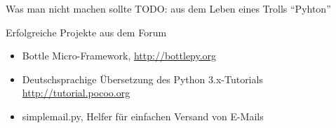 \documentclass{beamer}
\begin{document}
\begin{frame}{Was man nicht machen sollte}
  TODO: aus dem Leben eines Trolls
  \enquote{Pyhton}
\end{frame}

\begin{frame}{Erfolgreiche Projekte aus dem Forum}
  \begin{itemize}
    \item Bottle Micro-Framework, \url{http://bottlepy.org}
    \item Deutschsprachige Übersetzung des Python 3.x-Tutorials \url{http://tutorial.pocoo.org}
    \item simplemail.py, Helfer für einfachen Versand von E-Mails
  \end{itemize}
\end{frame}
\end{document}
